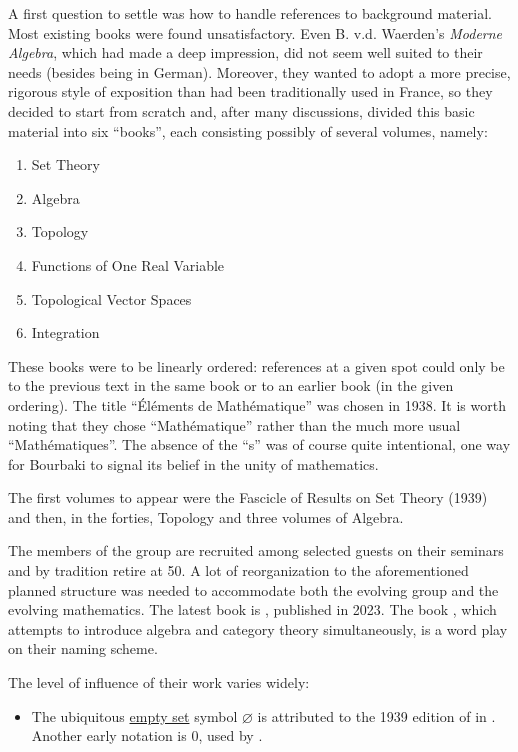 \begin{remark}
\begin{displayquote}
    A first question to settle was how to handle references to background material. Most existing books were found unsatisfactory. Even B. v.d. Waerden's \textit{Moderne Algebra}, which had made a deep impression, did not seem well suited to their needs (besides being in German). Moreover, they wanted to adopt a more precise, rigorous style of exposition than had been traditionally used in France, so they decided to start from scratch and, after many discussions, divided this basic material into six \enquote{books}, each consisting possibly of several volumes, namely:
    \begin{enumerate}[label=\Roman*]
      \item Set Theory
      \item Algebra
      \item Topology
      \item Functions of One Real Variable
      \item Topological Vector Spaces
      \item Integration
    \end{enumerate}

    These books were to be linearly ordered: references at a given spot could only be to the previous text in the same book or to an earlier book (in the given ordering). The title \enquote{\'El\'ements de Math\'ematique} was chosen in 1938. It is worth noting that they chose \enquote{Math\'ematique} rather than the much more usual \enquote{Math\'ematiques}. The absence of the \enquote{s} was of course quite intentional, one way for Bourbaki to signal its belief in the unity of mathematics.

    The first volumes to appear were the Fascicle of Results on Set Theory (1939) and then, in the forties, Topology and three volumes of Algebra.
  \end{displayquote}

  The members of the group are recruited among selected guests on their seminars and by tradition retire at 50. A lot of reorganization to the aforementioned planned structure was needed to accommodate both the evolving group and the evolving mathematics. The latest book is \cite{Bourbaki2023ThéoriesSpectrales3à5}, published in 2023. The book \cite{Aluffi2009Algebra}, which attempts to introduce algebra and category theory simultaneously, is a word play on their naming scheme.

  The level of influence of their work varies widely:
  \begin{itemize}
    \item The ubiquitous \hyperref[def:empty_set]{empty set} symbol \( \varnothing \) is attributed to the 1939 edition of \cite[E II.1]{Bourbaki1970ThéorieDesEnsembles} in \cite{MacTutor:EarliestUsesOfLogicSymbols}. Another early notation is \( 0 \), used by \textcite[12]{Hausdorff1935Mengenlehre}.


\end{itemize}
\end{remark}
